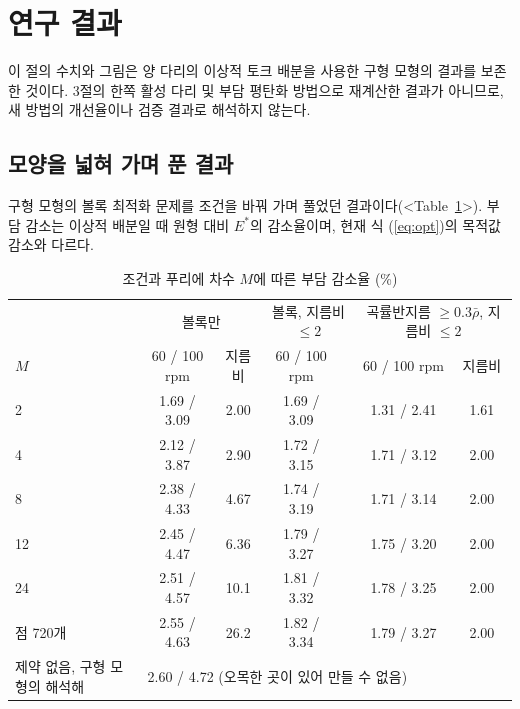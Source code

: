 \section{연구 결과}
이 절의 수치와 그림은 양 다리의 이상적 토크 배분을 사용한 구형 모형의 결과를 보존한 것이다. 3절의 한쪽 활성 다리 및 부담 평탄화 방법으로 재계산한 결과가 아니므로, 새 방법의 개선율이나 검증 결과로 해석하지 않는다.

\subsection{모양을 넓혀 가며 푼 결과}
구형 모형의 볼록 최적화 문제를 조건을 바꿔 가며 풀었던 결과이다(<Table~\ref{tab:conv}>). 부담 감소는 이상적 배분일 때 원형 대비 \(E^\ast\)의 감소율이며, 현재 식 (\ref{eq:opt})의 목적값 감소와 다르다.

\begin{table}[!htb]
\centering\small\renewcommand{\arraystretch}{1.0}
\begin{tabular}{@{}lcccccc@{}}
\toprule
 & \multicolumn{2}{c}{볼록만} & \multicolumn{2}{c}{볼록, 지름비 \(\le2\)} & \multicolumn{2}{c}{곡률반지름 \(\ge0.3\bar\rho\), 지름비 \(\le2\)}\\
\(M\) & 60 / 100 rpm & 지름비 & 60 / 100 rpm & & 60 / 100 rpm & 지름비\\\midrule
2 & 1.69 / 3.09 & 2.00 & 1.69 / 3.09 & & 1.31 / 2.41 & 1.61\\
4 & 2.12 / 3.87 & 2.90 & 1.72 / 3.15 & & 1.71 / 3.12 & 2.00\\
8 & 2.38 / 4.33 & 4.67 & 1.74 / 3.19 & & 1.71 / 3.14 & 2.00\\
12 & 2.45 / 4.47 & 6.36 & 1.79 / 3.27 & & 1.75 / 3.20 & 2.00\\
24 & 2.51 / 4.57 & 10.1 & 1.81 / 3.32 & & 1.78 / 3.25 & 2.00\\
점 720개 & 2.55 / 4.63 & 26.2 & 1.82 / 3.34 & & 1.79 / 3.27 & 2.00\\\midrule
제약 없음, 구형 모형의 해석해 & \multicolumn{6}{l}{2.60 / 4.72 (오목한 곳이 있어 만들 수 없음)}\\
\bottomrule
\end{tabular}
\caption{조건과 푸리에 차수 \(M\)에 따른 부담 감소율 (\%)}
\label{tab:conv}
\end{table}

